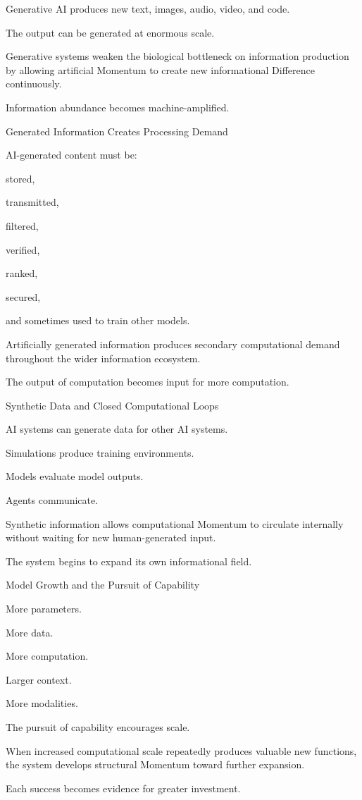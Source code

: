 Generative AI produces new text, images, audio, video, and code.

The output can be generated at enormous scale.

Generative systems weaken the biological bottleneck on information production by allowing artificial Momentum to create new informational Difference continuously.

Information abundance becomes machine-amplified.

Generated Information Creates Processing Demand

AI-generated content must be:

stored,

transmitted,

filtered,

verified,

ranked,

secured,

and sometimes used to train other models.

Artificially generated information produces secondary computational demand throughout the wider information ecosystem.

The output of computation becomes input for more computation.

Synthetic Data and Closed Computational Loops

AI systems can generate data for other AI systems.

Simulations produce training environments.

Models evaluate model outputs.

Agents communicate.

Synthetic information allows computational Momentum to circulate internally without waiting for new human-generated input.

The system begins to expand its own informational field.

Model Growth and the Pursuit of Capability

More parameters.

More data.

More computation.

Larger context.

More modalities.

The pursuit of capability encourages scale.

When increased computational scale repeatedly produces valuable new functions, the system develops structural Momentum toward further expansion.

Each success becomes evidence for greater investment.

